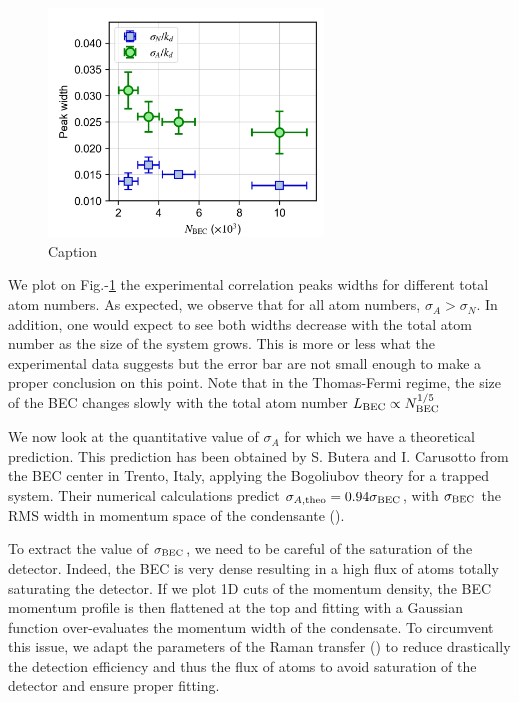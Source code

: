 \begin{figure}
    \centering
    \includegraphics[width=0.65\textwidth]{Fig/Chapter4/width.png}
    \caption{Caption}
    \label{fig:width}
\end{figure}

We plot on Fig.-\ref{fig:width} the experimental correlation peaks widths for different total atom numbers. As expected, we observe that for all atom numbers, $\sigma_A > \sigma_N$. In addition, one would expect to see both widths decrease with the total atom number as the size of the system grows. This is more or less what the experimental data suggests but the error bar are not small enough to make a proper conclusion on this point. Note that in the Thomas-Fermi regime, the size of the BEC changes slowly with the total atom number $L_{\rm{BEC}} \propto N_{\rm{BEC}}^{1/5}$ 

We now look at the quantitative value of $\sigma_A$ for which we have a theoretical prediction. This prediction has been obtained by S. Butera and I. Carusotto from the BEC center in Trento, Italy, applying the Bogoliubov theory for a trapped system. Their numerical calculations predict $\sigma_{A,\rm{theo}} = 0.94 \sigma_{\rm{BEC}}$, with $\sigma_{\rm{BEC}}$ the RMS width in momentum space of the condensante (). 

To extract the value of $\sigma_{\rm{BEC}}$, we need to be careful of the saturation of the detector. Indeed, the BEC is very dense resulting in a high flux of atoms totally saturating the detector. If we plot 1D cuts of the momentum density, the BEC momentum profile is then flattened at the top and fitting with a Gaussian function over-evaluates the momentum width of the condensate. To circumvent this issue, we adapt the parameters of the Raman transfer () to reduce drastically the detection efficiency and thus the flux of atoms to avoid saturation of the detector and ensure proper fitting.

